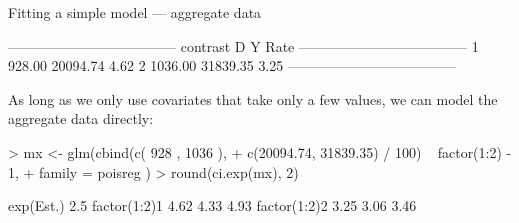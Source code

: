 \begin{frame}[fragile]{Fitting a simple model --- aggregate data}
\begin{Schunk}
\begin{Soutput}
 ------------------------------------ 
 contrast         D        Y    Rate  
 ------------------------------------ 
 1           928.00 20094.74    4.62  
 2          1036.00 31839.35    3.25  
 ------------------------------------ 
\end{Soutput}
\end{Schunk}
\vspace*{-1em}
\small
As long as we only use covariates that take only a few values, we can
model the aggregate data directly:
\vspace*{-1ex}
\begin{Schunk}
\begin{Sinput}
> mx <- glm(cbind(c(  928   ,  1036   ),
+                 c(20094.74, 31839.35) / 100) ~ factor(1:2) - 1,
+           family = poisreg )
> round(ci.exp(mx), 2)
\end{Sinput}
\begin{Soutput}
             exp(Est.) 2.5%
factor(1:2)1      4.62 4.33  4.93
factor(1:2)2      3.25 3.06  3.46
\end{Soutput}
\end{Schunk}
\end{frame}
